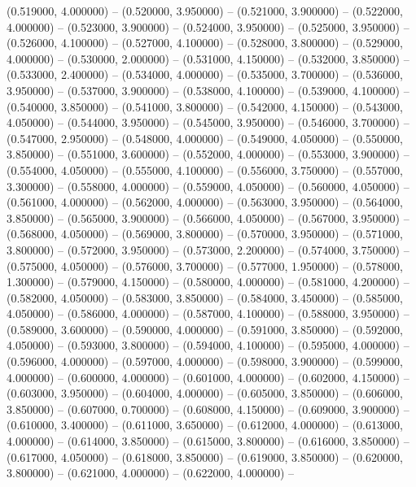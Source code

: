 (0.519000, 4.000000) -- 
(0.520000, 3.950000) -- 
(0.521000, 3.900000) -- 
(0.522000, 4.000000) -- 
(0.523000, 3.900000) -- 
(0.524000, 3.950000) -- 
(0.525000, 3.950000) -- 
(0.526000, 4.100000) -- 
(0.527000, 4.100000) -- 
(0.528000, 3.800000) -- 
(0.529000, 4.000000) -- 
(0.530000, 2.000000) -- 
(0.531000, 4.150000) -- 
(0.532000, 3.850000) -- 
(0.533000, 2.400000) -- 
(0.534000, 4.000000) -- 
(0.535000, 3.700000) -- 
(0.536000, 3.950000) -- 
(0.537000, 3.900000) -- 
(0.538000, 4.100000) -- 
(0.539000, 4.100000) -- 
(0.540000, 3.850000) -- 
(0.541000, 3.800000) -- 
(0.542000, 4.150000) -- 
(0.543000, 4.050000) -- 
(0.544000, 3.950000) -- 
(0.545000, 3.950000) -- 
(0.546000, 3.700000) -- 
(0.547000, 2.950000) -- 
(0.548000, 4.000000) -- 
(0.549000, 4.050000) -- 
(0.550000, 3.850000) -- 
(0.551000, 3.600000) -- 
(0.552000, 4.000000) -- 
(0.553000, 3.900000) -- 
(0.554000, 4.050000) -- 
(0.555000, 4.100000) -- 
(0.556000, 3.750000) -- 
(0.557000, 3.300000) -- 
(0.558000, 4.000000) -- 
(0.559000, 4.050000) -- 
(0.560000, 4.050000) -- 
(0.561000, 4.000000) -- 
(0.562000, 4.000000) -- 
(0.563000, 3.950000) -- 
(0.564000, 3.850000) -- 
(0.565000, 3.900000) -- 
(0.566000, 4.050000) -- 
(0.567000, 3.950000) -- 
(0.568000, 4.050000) -- 
(0.569000, 3.800000) -- 
(0.570000, 3.950000) -- 
(0.571000, 3.800000) -- 
(0.572000, 3.950000) -- 
(0.573000, 2.200000) -- 
(0.574000, 3.750000) -- 
(0.575000, 4.050000) -- 
(0.576000, 3.700000) -- 
(0.577000, 1.950000) -- 
(0.578000, 1.300000) -- 
(0.579000, 4.150000) -- 
(0.580000, 4.000000) -- 
(0.581000, 4.200000) -- 
(0.582000, 4.050000) -- 
(0.583000, 3.850000) -- 
(0.584000, 3.450000) -- 
(0.585000, 4.050000) -- 
(0.586000, 4.000000) -- 
(0.587000, 4.100000) -- 
(0.588000, 3.950000) -- 
(0.589000, 3.600000) -- 
(0.590000, 4.000000) -- 
(0.591000, 3.850000) -- 
(0.592000, 4.050000) -- 
(0.593000, 3.800000) -- 
(0.594000, 4.100000) -- 
(0.595000, 4.000000) -- 
(0.596000, 4.000000) -- 
(0.597000, 4.000000) -- 
(0.598000, 3.900000) -- 
(0.599000, 4.000000) -- 
(0.600000, 4.000000) -- 
(0.601000, 4.000000) -- 
(0.602000, 4.150000) -- 
(0.603000, 3.950000) -- 
(0.604000, 4.000000) -- 
(0.605000, 3.850000) -- 
(0.606000, 3.850000) -- 
(0.607000, 0.700000) -- 
(0.608000, 4.150000) -- 
(0.609000, 3.900000) -- 
(0.610000, 3.400000) -- 
(0.611000, 3.650000) -- 
(0.612000, 4.000000) -- 
(0.613000, 4.000000) -- 
(0.614000, 3.850000) -- 
(0.615000, 3.800000) -- 
(0.616000, 3.850000) -- 
(0.617000, 4.050000) -- 
(0.618000, 3.850000) -- 
(0.619000, 3.850000) -- 
(0.620000, 3.800000) -- 
(0.621000, 4.000000) -- 
(0.622000, 4.000000) -- 
